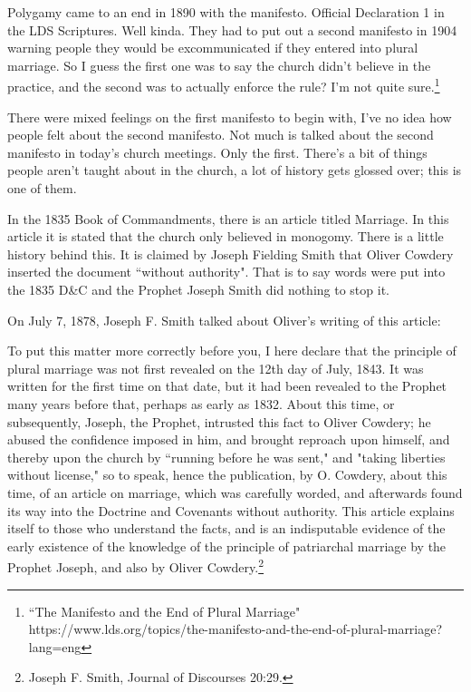 Polygamy came to an end in 1890 with the manifesto. Official Declaration 1 in the
LDS Scriptures. Well kinda. They had to put out a second manifesto in 1904 warning
people they would be excommunicated if they entered into plural marriage. So I guess
the first one was to say the church didn't believe in the practice, and the second
was to actually enforce the rule? I'm not quite sure.\footnote{
``The Manifesto and the End of Plural Marriage"
https://www.lds.org/topics/the-manifesto-and-the-end-of-plural-marriage?lang=eng
}

There were mixed feelings on the first manifesto to begin with, I've no idea how
people felt about the second manifesto. Not much is talked about the second manifesto
in today's church meetings. Only the first. There's a bit of things people aren't
taught about in the church, a lot of history gets glossed over; this is one of them.

In the 1835 Book of Commandments, there is an article titled Marriage. In this
article it is stated that the church only believed in monogomy. There is a little
history behind this. It is claimed by Joseph Fielding Smith that Oliver Cowdery
inserted the document ``without authority". That is to say words were put into the
1835 D\&C and the Prophet Joseph Smith did nothing to stop it.

On July 7, 1878, Joseph F. Smith talked about Oliver's writing of this article:

\begin{displayquote}
To put this matter more correctly before you, I here declare that the principle of 
plural marriage was not first revealed on the 12th day of July, 1843. It was 
written for the first time on that date, but it had been revealed to the Prophet 
many years before that, perhaps as early as 1832. About this time, or 
subsequently, Joseph, the Prophet, intrusted this fact to Oliver Cowdery; he 
abused the confidence imposed in him, and brought reproach upon himself, and 
thereby upon the church by ``running before he was sent," and "taking liberties 
without license," so to speak, hence the publication, by O. Cowdery, about this 
time, of an article on marriage, which was carefully worded, and afterwards found 
its way into the Doctrine and Covenants without authority. This article explains 
itself to those who understand the facts, and is an indisputable evidence of the 
early existence of the knowledge of the principle of patriarchal marriage by the 
Prophet Joseph, and also by Oliver Cowdery.\footnote{Joseph F. Smith, Journal of 
Discourses 20:29.}
\end{displayquote}

